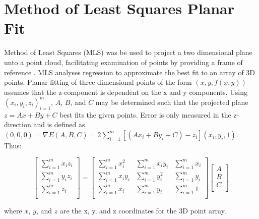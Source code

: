 \documentclass[numbered,pdftex]{ohio-etd}
\begin{document}
{{		
	} %
	
	\section{Method of Least Squares Planar Fit}{
	
		{Method of Least Squares (MLS) was be used to project a two dimensional plane unto a point cloud, facilitating examination of points by providing a frame of reference \cite{miller_method_nodate, gojcic_perfect_2019}. MLS analyses regression to approximate the best fit to an array of 3D points. Planar fitting of three dimensional points of the form $(x,y, f(x,y))$ assumes that the z-component is dependent on the x and y components. Using ${(x_i, y_i, z_i)}_{i=1}^m$, $A$, $B$, and $C$ may be determined such that the projected plane $z = Ax + By + C$ best fits the given points. Error is only measured in the z-direction and is defined as $(0,0,0) = \nabla E(A, B, C) = 2\sum_{i=1}^{m}[(Ax_i + By_i + C) - z_i](x_i,y_i,1)$. Thus:}
	
		\begin{equation}
			\left[ {\begin{array}{cc}
					\sum_{i=1}^{m} x_i z_i \\
					\sum_{i=1}^{m} y_i z_i \\
					\sum_{i=1}^{m} z_i \\
					
			\end{array} } \right]
			=
			\left[ {\begin{array}{ccc}
					\sum_{i=1}^{m} x_i^2 		& \sum_{i=1}^{m} x_i y_i 		& \sum_{i=1}^{m} x_i \\
					\sum_{i=1}^{m} x_i y_i 		& \sum_{i=1}^{m} y_i^2 			& \sum_{i=1}^{m} y_i \\
					\sum_{i=1}^{m} x_i 			& \sum_{i=1}^{m} y_i 			& \sum_{i=1}^{m} 1   \\
			\end{array} } \right]
			\left[ {\begin{array}{cc}
					A\\
					B\\
					C\\
			\end{array} } \right]
			\label{FOV}
		\end{equation}
		
		{where $x$, $y$, and $z$ are the x, y, and z coordinates for the 3D point array.}
	
%		

}}
\end{document}
